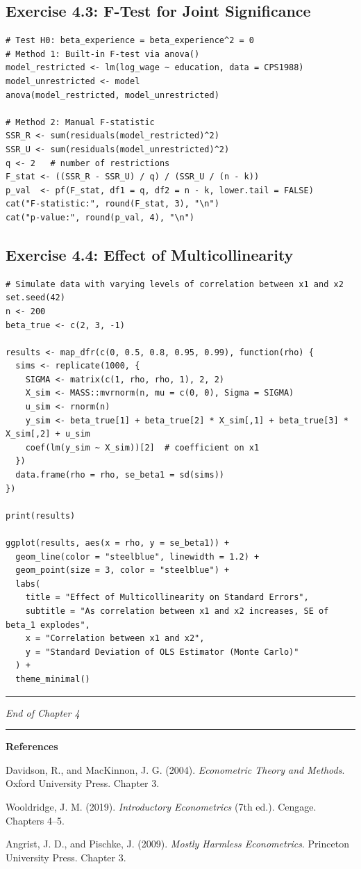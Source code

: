 \subsection{Exercise 4.3: F-Test for Joint Significance}

\begin{lstlisting}
# Test H0: beta_experience = beta_experience^2 = 0
# Method 1: Built-in F-test via anova()
model_restricted <- lm(log_wage ~ education, data = CPS1988)
model_unrestricted <- model
anova(model_restricted, model_unrestricted)

# Method 2: Manual F-statistic
SSR_R <- sum(residuals(model_restricted)^2)
SSR_U <- sum(residuals(model_unrestricted)^2)
q <- 2   # number of restrictions
F_stat <- ((SSR_R - SSR_U) / q) / (SSR_U / (n - k))
p_val  <- pf(F_stat, df1 = q, df2 = n - k, lower.tail = FALSE)
cat("F-statistic:", round(F_stat, 3), "\n")
cat("p-value:", round(p_val, 4), "\n")
\end{lstlisting}

\subsection{Exercise 4.4: Effect of Multicollinearity}

\begin{lstlisting}
# Simulate data with varying levels of correlation between x1 and x2
set.seed(42)
n <- 200
beta_true <- c(2, 3, -1)

results <- map_dfr(c(0, 0.5, 0.8, 0.95, 0.99), function(rho) {
  sims <- replicate(1000, {
    SIGMA <- matrix(c(1, rho, rho, 1), 2, 2)
    X_sim <- MASS::mvrnorm(n, mu = c(0, 0), Sigma = SIGMA)
    u_sim <- rnorm(n)
    y_sim <- beta_true[1] + beta_true[2] * X_sim[,1] + beta_true[3] * X_sim[,2] + u_sim
    coef(lm(y_sim ~ X_sim))[2]  # coefficient on x1
  })
  data.frame(rho = rho, se_beta1 = sd(sims))
})

print(results)

ggplot(results, aes(x = rho, y = se_beta1)) +
  geom_line(color = "steelblue", linewidth = 1.2) +
  geom_point(size = 3, color = "steelblue") +
  labs(
    title = "Effect of Multicollinearity on Standard Errors",
    subtitle = "As correlation between x1 and x2 increases, SE of beta_1 explodes",
    x = "Correlation between x1 and x2",
    y = "Standard Deviation of OLS Estimator (Monte Carlo)"
  ) +
  theme_minimal()
\end{lstlisting}

\medskip\hrule\medskip

\textit{End of Chapter 4}

\medskip\hrule\medskip

\textbf{References}

Davidson, R., and MacKinnon, J. G. (2004). \textit{Econometric Theory and Methods}. Oxford University Press. Chapter 3.

Wooldridge, J. M. (2019). \textit{Introductory Econometrics} (7th ed.). Cengage. Chapters 4--5.

Angrist, J. D., and Pischke, J. (2009). \textit{Mostly Harmless Econometrics}. Princeton University Press. Chapter 3.
